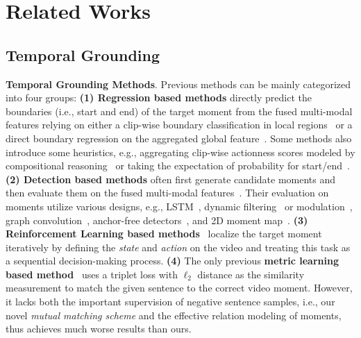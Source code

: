 \documentclass[letterpaper]{article} \usepackage{aaai22}  \usepackage{times}  \usepackage{helvet}  \usepackage{courier}  \usepackage[hyphens]{url}  \usepackage{graphicx} \urlstyle{rm} \def\UrlFont{\rm}  \usepackage{natbib}  \usepackage{caption} \DeclareCaptionStyle{ruled}{labelfont=normalfont,labelsep=colon,strut=off} \frenchspacing  \setlength{\pdfpagewidth}{8.5in}  \setlength{\pdfpageheight}{11in}  \usepackage{algorithm}
\begin{document}
\section{Related Works}
\subsection{Temporal Grounding}
\noindent\textbf{Temporal Grounding Methods}. Previous methods can be mainly categorized into four groups: \textbf{(1) Regression based methods} directly predict the boundaries (i.e., start and end) of the target moment from the fused multi-modal features relying on either a clip-wise boundary classification in local regions~\cite{DBLP:conf/naacl/GhoshAPH19,DBLP:conf/wacv/OpazoMSLG20, DBLP:conf/acl/ZhangSJZ20,DBLP:conf/aaai/ChenLTXZTL20} or a direct boundary regression on the aggregated global feature~\cite{DBLP:conf/aaai/YuanM019,DBLP:conf/aaai/Wang0J20,DBLP:conf/cvpr/MunCH20}. Some methods also introduce some heuristics, e.g., aggregating clip-wise actionness scores modeled by compositional reasoning~\cite{DBLP:conf/eccv/LiuYCHFN18} or taking the expectation of probability for start/end~\cite{DBLP:conf/naacl/GhoshAPH19}. \textbf{(2) Detection based methods} often first generate candidate moments and then evaluate them on the fused multi-modal features~\cite{DBLP:conf/iccv/GaoSYN17, DBLP:conf/wacv/GeGCN19}. Their evaluation on moments utilize various designs, e.g., LSTM~\cite{DBLP:conf/emnlp/ChenCMJC18,DBLP:conf/aaai/Xu0PSSS19}, dynamic filtering~\cite{DBLP:conf/cvpr/ZhangDWWD19,DBLP:conf/wacv/OpazoMSLG20} or modulation~\cite{DBLP:conf/nips/YuanMWL019}, graph convolution~\cite{DBLP:conf/cvpr/ZhangDWWD19}, anchor-free detectors~\cite{DBLP:conf/emnlp/LuCTLX19,DBLP:conf/cvpr/ZengXHCTG20}, and 2D moment map~\cite{DBLP:conf/aaai/ZhangPFL20}.  \textbf{(3) Reinforcement Learning based methods}~\cite{DBLP:conf/aaai/HeZHLLW19,DBLP:conf/cvpr/WangHW19,DBLP:conf/aaai/WuLLL20} localize the target moment iteratively by defining the {\em state} and {\em action} on the video and treating this task as a sequential decision-making process. \textbf{(4)} The only previous \textbf{metric learning based method}~\cite{DBLP:conf/iccv/HendricksWSSDR17} uses a triplet loss with $\ell_2$ distance as the similarity measurement to match the given sentence to the correct video moment. However, it lacks both the important supervision of negative sentence samples, i.e., our novel {\em mutual matching scheme} and the effective relation modeling of moments, thus achieves much worse results than ours.
\end{document}
